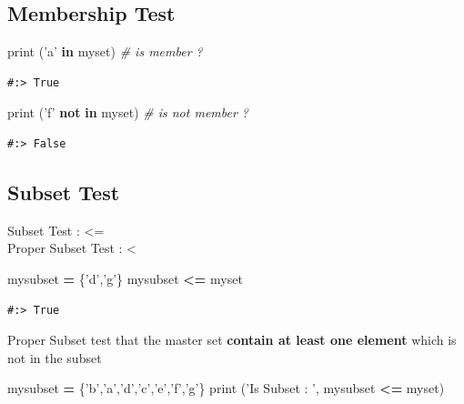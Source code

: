 \documentclass[
]{book}
\newenvironment{Shaded}{\begin{snugshade}}{\end{snugshade}}
\newcommand{\BuiltInTok}[1]{#1}
\newcommand{\CommentTok}[1]{\textcolor[rgb]{0.37,0.37,0.37}{\textit{#1}}}
\newcommand{\KeywordTok}[1]{\textcolor[rgb]{0.27,0.27,0.27}{\textbf{#1}}}
\newcommand{\NormalTok}[1]{#1}
\newcommand{\OperatorTok}[1]{\textcolor[rgb]{0.43,0.43,0.43}{\textbf{#1}}}
\newcommand{\StringTok}[1]{\textcolor[rgb]{0.5,0.5,0.5}{#1}}
\begin{document}
\hypertarget{membership-test}{%
\subsection{Membership Test}\label{membership-test}}

\begin{Shaded}
\begin{Highlighting}[]
\BuiltInTok{print}\NormalTok{ (}\StringTok{'a'} \KeywordTok{in}\NormalTok{ myset)      }\CommentTok{# is member ?}
\end{Highlighting}
\end{Shaded}

\begin{verbatim}
#:> True
\end{verbatim}

\begin{Shaded}
\begin{Highlighting}[]
\BuiltInTok{print}\NormalTok{ (}\StringTok{'f'} \KeywordTok{not} \KeywordTok{in}\NormalTok{ myset)  }\CommentTok{# is not member ?}
\end{Highlighting}
\end{Shaded}

\begin{verbatim}
#:> False
\end{verbatim}

\hypertarget{subset-test}{%
\subsection{Subset Test}\label{subset-test}}

Subset Test : \textless=\\
Proper Subset Test : \textless{}

\begin{Shaded}
\begin{Highlighting}[]
\NormalTok{mysubset }\OperatorTok{=}\NormalTok{ \{}\StringTok{'d'}\NormalTok{,}\StringTok{'g'}\NormalTok{\}}
\NormalTok{mysubset }\OperatorTok{<=}\NormalTok{ myset}
\end{Highlighting}
\end{Shaded}

\begin{verbatim}
#:> True
\end{verbatim}

Proper Subset test that the master set \textbf{contain at least one element} which is not in the subset

\begin{Shaded}
\begin{Highlighting}[]
\NormalTok{mysubset }\OperatorTok{=}\NormalTok{ \{}\StringTok{'b'}\NormalTok{,}\StringTok{'a'}\NormalTok{,}\StringTok{'d'}\NormalTok{,}\StringTok{'c'}\NormalTok{,}\StringTok{'e'}\NormalTok{,}\StringTok{'f'}\NormalTok{,}\StringTok{'g'}\NormalTok{\}}
\BuiltInTok{print}\NormalTok{ (}\StringTok{'Is Subset : '}\NormalTok{, mysubset }\OperatorTok{<=}\NormalTok{ myset)}
\end{Highlighting}
\end{Shaded}
\end{document}
